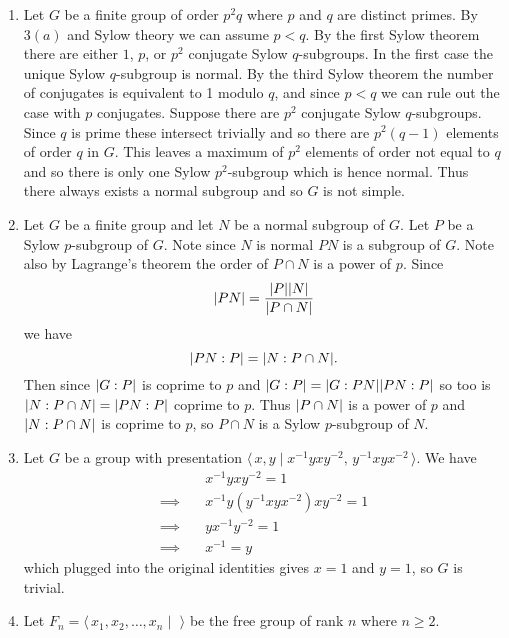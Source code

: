 \documentclass[a4paper, 12pt]{article}
\DeclarePairedDelimiter\abs{\lvert}{\rvert}
\begin{document}
\begin{enumerate}
\begin{enumerate}
\end{enumerate}

\item Let \(G\) be a finite group of order \(p^2q\) where \(p\) and \(q\) are distinct primes. By \(3(a)\) and Sylow theory we can assume \(p<q\). By the first Sylow theorem there are either \(1\), \(p\), or \(p^2\) conjugate Sylow \(q\)-subgroups. In the first case the unique Sylow \(q\)-subgroup is normal. By the third Sylow theorem the number of conjugates is equivalent to 1 modulo \(q\), and since \(p<q\) we can rule out the case with \(p\) conjugates. Suppose there are \(p^2\) conjugate Sylow \(q\)-subgroups. Since \(q\) is prime these intersect trivially and so there are \(p^2(q-1)\) elements of order \(q\) in \(G\). This leaves a maximum of \(p^2\) elements of order not equal to \(q\) and so there is only one Sylow \(p^2\)-subgroup which is hence normal. Thus there always exists a normal subgroup and so \(G\) is not simple.

\item Let \(G\) be a finite group and let \(N\) be a normal subgroup of \(G\). Let \(P\) be a Sylow \(p\)-subgroup of \(G\). Note since \(N\) is normal \(PN\) is a subgroup of \(G\). Note also by Lagrange's theorem the order of \(P\cap N\) is a power of \(p\). Since
\[\abs{PN}=\frac{\abs P\abs N}{\abs{P\cap N}}\]
we have
\[\abs{PN:P}=\abs{N:P\cap N}.\]
Then since \(\abs{G:P}\) is coprime to \(p\) and \(\abs{G:P}=\abs{G:PN}\abs{PN:P}\) so too is \(\abs{N:P\cap N}=\abs{PN:P}\) coprime to \(p\). Thus \(\abs{P\cap N}\) is a power of \(p\) and \(\abs{N:P\cap N}\) is coprime to \(p\), so \(P\cap N\) is a Sylow \(p\)-subgroup of \(N\).

\item Let \(G\) be a group with presentation \(\langle\,x,y\mid x^{-1}yxy^{-2},\,y^{-1}xyx^{-2}\,\rangle\). We have
\begin{align*}
&x^{-1}yxy^{-2}=1\\
\implies\quad&x^{-1}y(y^{-1}xyx^{-2})xy^{-2}=1\\
\implies\quad&yx^{-1}y^{-2}=1\\
\implies\quad&x^{-1}=y
\end{align*}
which plugged into the original identities gives \(x=1\) and \(y=1\), so \(G\) is trivial.

\item Let \(F_n=\langle\,x_1,x_2,\dots,x_n\mid\,\,\rangle\) be the free group of rank \(n\) where \(n\geq2\).

\begin{enumerate}


\end{enumerate}
\end{enumerate}
\end{document}
